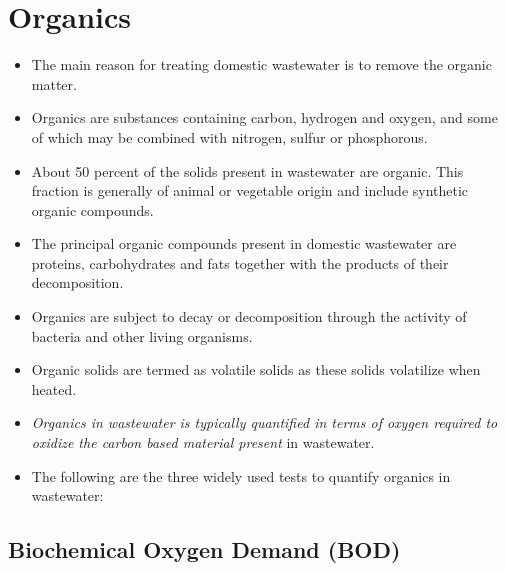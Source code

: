 		\section{Organics}		
		\begin{itemize}
			\item The main reason for treating domestic wastewater is to remove the organic matter.  
			\item Organics are substances containing carbon, hydrogen and oxygen, and some of which may be combined with nitrogen, sulfur or phosphorous.
			\item About 50 percent of the solids present in wastewater are organic.  This fraction is generally of animal or vegetable origin and include synthetic organic compounds.
			\item The principal organic compounds present in domestic wastewater are proteins, carbohydrates and fats together with the products of their decomposition.
			\item Organics are subject to decay or decomposition through the activity of bacteria and other living organisms.  
			\item Organic solids are termed as volatile solids as these solids volatilize when heated.	
			\item \emph{Organics in wastewater is typically quantified in terms of oxygen required to oxidize the carbon based material present} in wastewater.  
			\item The following are the three widely used tests to quantify organics in wastewater:
		\end{itemize}
\subsection{Biochemical Oxygen Demand (BOD)}

